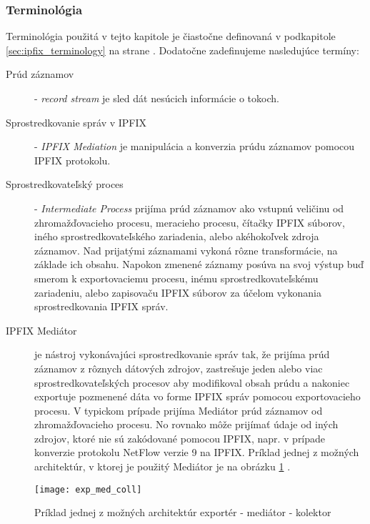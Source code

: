 \subsubsection{Terminológia}
Terminológia použitá v tejto kapitole je čiastočne definovaná v podkapitole \ref{sec:ipfix_terminology} 
na strane \pageref{sec:ipfix_terminology}. 
Dodatočne zadefinujeme nasledujúce termíny:
\begin{description}
 \item[Prúd záznamov] - \emph{record stream} je sled dát nesúcich informácie o tokoch.
 
 \item[Sprostredkovanie správ v IPFIX] - \emph{IPFIX Mediation} je manipulácia a konverzia prúdu záznamov
 pomocou IPFIX protokolu.
 
 \item[Sprostredkovateľský proces] - \emph{Intermediate Process} prijíma prúd záznamov ako vstupnú 
 veličinu od zhromažďovacieho procesu, meracieho procesu, čítačky IPFIX súborov, iného 
 sprostredkovateľského zariadenia, alebo akéhokoľvek zdroja záznamov. Nad prijatými záznamami
 vykoná rôzne transformácie, na základe ich obsahu. Napokon zmenené záznamy posúva na svoj výstup buď
 smerom k exportovaciemu procesu, inému sprostredkovateľskému zariadeniu, alebo zapisovaču IPFIX súborov
 za účelom vykonania sprostredkovania IPFIX správ.
 
 \item[IPFIX Mediátor] je nástroj vykonávajúci sprostredkovanie správ tak, že prijíma prúd záznamov 
 z rôznych dátových zdrojov, zastrešuje jeden alebo viac sprostredkovateľských procesov  
 aby modifikoval obsah prúdu a nakoniec exportuje pozmenené dáta vo forme IPFIX správ pomocou exportovacieho
 procesu. V typickom prípade prijíma Mediátor prúd záznamov od zhromažďovacieho procesu. No rovnako môže
 prijímať údaje od iných zdrojov, ktoré nie sú zakódované pomocou IPFIX, napr. v prípade konverzie 
 protokolu NetFlow verzie 9 \citep{rfc3954} na IPFIX. Príklad jednej z možných architektúr, 
 v ktorej je použitý Mediátor je na obrázku \ref{o:exp_med_coll} \citep{rfc5982}.
\end{description}

\begin{figure}[ht!]
\centering
\texttt{[image: exp\_med\_coll]}
\caption{Príklad jednej z možných architektúr exportér - mediátor - kolektor}\label{o:exp_med_coll}
\end{figure}



